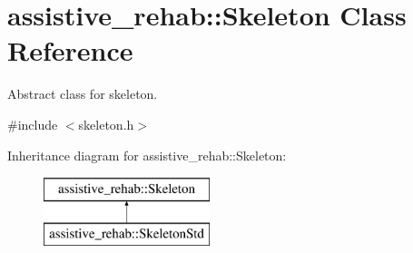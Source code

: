 \section{assistive\+\_\+rehab\+:\+:Skeleton Class Reference}
\label{classassistive__rehab_1_1Skeleton}


Abstract class for skeleton.  




{\ttfamily \#include $<$skeleton.\+h$>$}

Inheritance diagram for assistive\+\_\+rehab\+:\+:Skeleton\+:\begin{figure}[H]
\begin{center}
\leavevmode
\includegraphics[height=2.000000cm]{classassistive__rehab_1_1Skeleton}
\end{center}
\end{figure}
